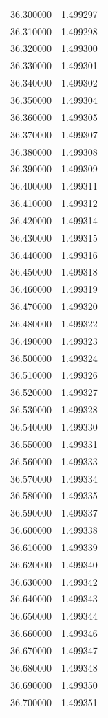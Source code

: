 \begin{tabular}{rr}
36.300000 & 1.499297 \\
36.310000 & 1.499298 \\
36.320000 & 1.499300 \\
36.330000 & 1.499301 \\
36.340000 & 1.499302 \\
36.350000 & 1.499304 \\
36.360000 & 1.499305 \\
36.370000 & 1.499307 \\
36.380000 & 1.499308 \\
36.390000 & 1.499309 \\
36.400000 & 1.499311 \\
36.410000 & 1.499312 \\
36.420000 & 1.499314 \\
36.430000 & 1.499315 \\
36.440000 & 1.499316 \\
36.450000 & 1.499318 \\
36.460000 & 1.499319 \\
36.470000 & 1.499320 \\
36.480000 & 1.499322 \\
36.490000 & 1.499323 \\
36.500000 & 1.499324 \\
36.510000 & 1.499326 \\
36.520000 & 1.499327 \\
36.530000 & 1.499328 \\
36.540000 & 1.499330 \\
36.550000 & 1.499331 \\
36.560000 & 1.499333 \\
36.570000 & 1.499334 \\
36.580000 & 1.499335 \\
36.590000 & 1.499337 \\
36.600000 & 1.499338 \\
36.610000 & 1.499339 \\
36.620000 & 1.499340 \\
36.630000 & 1.499342 \\
36.640000 & 1.499343 \\
36.650000 & 1.499344 \\
36.660000 & 1.499346 \\
36.670000 & 1.499347 \\
36.680000 & 1.499348 \\
36.690000 & 1.499350 \\
36.700000 & 1.499351 \\

\end{tabular}

